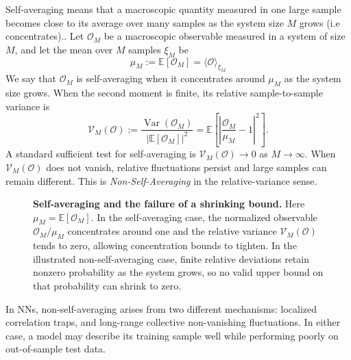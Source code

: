 Self-averaging means that a macroscopic quantity
measured in one large sample becomes close to its average over many samples as
the system size $M$ grows (i.e concentrates).. 
%
%
%
Let $\mathcal{O}_M$ be a macroscopic observable measured in a system
of size $M$, and let the mean over $M$ samples $\xi_M$ be
\begin{equation}
\mu_M:=\mathbb{E}[\mathcal{O}_M]=\langle\mathcal{O}\rangle_{\xi_M}
\end{equation}
We say that $\mathcal{O}_M$ is self-averaging when it concentrates around $\mu_M$ as
the system size grows. When the second moment is finite, its relative
sample-to-sample variance is
\begin{equation}
\mathcal V_M(\mathcal O)
:=
\frac{\operatorname{Var}(\mathcal O_M)}
{\left|\mathbb E[\mathcal O_M]\right|^2}
=
\mathbb E\!\left[
\left|
\frac{\mathcal O_M}{\mu_M}-1
\right|^2
\right].
\label{eq:relative_variance}
\end{equation}
A standard sufficient test for self-averaging is
$\mathcal{V}_M(\mathcal{O})\to0$ as $M\to\infty$. When
$\mathcal{V}_M(\mathcal{O})$ does not vanish, relative fluctuations persist and
large samples can remain different.
This is \emph{Non-Self-Averaging} in the relative-variance sense.

\begin{figure}[!b]
\centering
{}
\caption{\textbf{Self-averaging and the failure of a shrinking bound.}
Here $\mu_M=\mathbb{E}[\mathcal{O}_M]$. In the self-averaging case, the normalized
observable $\mathcal{O}_M/\mu_M$ concentrates around one and the relative variance
$\mathcal{V}_M(\mathcal{O})$ tends to zero, allowing concentration bounds to tighten.
In the illustrated non-self-averaging case, finite relative deviations retain
nonzero probability as the system grows, so no valid upper bound on that
probability can shrink to zero.}
\label{fig:self_average_schematic}
\end{figure}

In NNs, non-self-averaging arises
from two different mechanisms: localized correlation traps, and 
long-range collective non-vanishing fluctuations.
In either case, a model may describe its training sample well while
performing poorly on out-of-sample test data.

